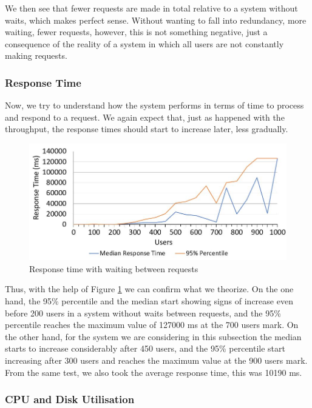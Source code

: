    We then see that fewer requests are made in total relative to a system without waits, which makes perfect sense. Without wanting to fall into redundancy, more waiting, fewer requests, however, this is not something negative, just a consequence of the reality of a system in which all users are not constantly making requests.
  
  \subsubsection{Response Time}
  
  Now, we try to understand how the system performs in terms of time to process and respond to a request. We again expect that, just as happened with the throughput, the response times should start to increase later, less gradually.
  
  \begin{figure}[H]
    \centering
    \includegraphics[width=1\textwidth]{img/performance_evaluation/wait_time.JPG}
    \caption{\label{tab:time_wait}Response time with waiting between requests}
  \end{figure}
  
  Thus, with the help of Figure \ref{tab:time_wait} we can confirm what we theorize. On the one hand, the 95\% percentile and the median start showing signs of increase even before 200 users in a system without waits between requests, and the 95\% percentile reaches the maximum value of 127000 ms at the 700 users mark. On the other hand, for the system we are considering in this subsection the median starts to increase considerably after 450 users, and the 95\% percentile start increasing after 300 users and reaches the maximum value at the 900 users mark. 
  From the same test, we also took the average response time, this was 10190 ms.
  
  \subsubsection{CPU and Disk Utilisation}
  
